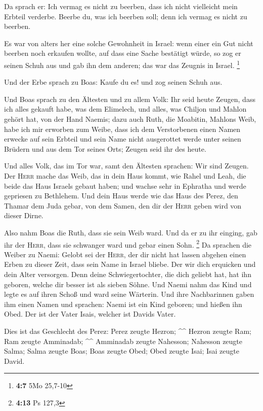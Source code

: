  Da sprach er: Ich vermag es nicht zu beerben, dass ich
nicht vielleicht mein Erbteil verderbe. Beerbe du, was ich beerben soll;
denn ich vermag es nicht zu beerben.

 Es war von alters her eine solche Gewohnheit in Israel:
wenn einer ein Gut nicht beerben noch erkaufen wollte, auf dass eine
Sache bestätigt würde, so zog er seinen Schuh aus und gab ihn dem
anderen; das war das Zeugnis in Israel. \footnote{\textbf{4:7} 5Mo
  25,7-10}

 Und der Erbe sprach zu Boas: Kaufe du es! und zog seinen
Schuh aus.

 Und Boas sprach zu den Ältesten und zu allem Volk: Ihr
seid heute Zeugen, dass ich alles gekauft habe, was dem Elimelech, und
alles, was Chiljon und Mahlon gehört hat, von der Hand Naemis;
 dazu auch Ruth, die Moabitin, Mahlons Weib, habe ich mir
erworben zum Weibe, dass ich dem Verstorbenen einen Namen erwecke auf
sein Erbteil und sein Name nicht ausgerottet werde unter seinen Brüdern
und aus dem Tor seines Orts; Zeugen seid ihr des heute.

 Und alles Volk, das im Tor war, samt den Ältesten
sprachen: Wir sind Zeugen. Der \textsc{Herr} mache das Weib, das in dein
Haus kommt, wie Rahel und Leah, die beide das Haus Israels gebaut haben;
und wachse sehr in Ephratha und werde gepriesen zu Bethlehem.
 Und dein Haus werde wie das Haus des Perez, den Thamar
dem Juda gebar, von dem Samen, den dir der \textsc{Herr} geben wird von
dieser Dirne.

 Also nahm Boas die Ruth, dass sie sein Weib ward. Und da
er zu ihr einging, gab ihr der \textsc{Herr}, dass sie schwanger ward
und gebar einen Sohn. \footnote{\textbf{4:13} Ps 127,3} 
Da sprachen die Weiber zu Naemi: Gelobt sei der \textsc{Herr}, der dir
nicht hat lassen abgehen einen Erben zu dieser Zeit, dass sein Name in
Israel bliebe.  Der wir dich erquicken und dein Alter
versorgen. Denn deine Schwiegertochter, die dich geliebt hat, hat ihn
geboren, welche dir besser ist als sieben Söhne.  Und
Naemi nahm das Kind und legte es auf ihren Schoß und ward seine
Wärterin.  Und ihre Nachbarinnen gaben ihm einen Namen
und sprachen: Naemi ist ein Kind geboren; und hießen ihn Obed. Der ist
der Vater Isais, welcher ist Davids Vater.

 Dies ist das Geschlecht des Perez: Perez zeugte Hezron;
\^{}\^{}  Hezron zeugte Ram; Ram zeugte Amminadab;
\^{}\^{}  Amminadab zeugte Nahesson; Nahesson zeugte
Salma;  Salma zeugte Boas; Boas zeugte Obed;
 Obed zeugte Isai; Isai zeugte David.
